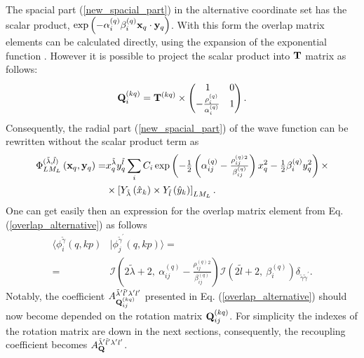 \documentclass[
12pt, %
oneside, %
english, %
onehalfspacing, %
onehalfspacing, %
headsepline, %
]{MastersDoctoralThesis} %
\begin{document}
The spacial part (\ref{new_spacial_part}) in the alternative coordinate set has the scalar product, $\exp \left(- \alpha_i^{(q)} \beta_i^{(q)}  {\bf x}_q \cdot {\bf y}_q  \right)$. With this form the overlap matrix elements can be calculated directly, using the expansion of the exponential function \cite{suzuki1998stochastic}. However it is possible  to project the scalar product into ${\bf T}$ matrix \cite{kukulin1990dynamic} as follows:
 \begin{equation}
{\bf Q}_i^{(kq)}= {\bf T}^{(kq)} \times
\begin{pmatrix}
1 &  0 \\ 
-\tfrac{\rho^{(q)}_{i}}{\alpha^{(q)}_i} & 1
\end{pmatrix} .
\end{equation}
Consequently, the radial part (\ref{new_spacial_part}) of the wave function can be rewritten without the scalar product term as
\begin{align}
 \Phi_{LM_L}^{(\tilde{\lambda},\tilde{l}) } \left(  {\bf x}_q, {\bf y}_q \right)  =  &
x^{\tilde{\lambda}}_q y^{\tilde{l}}_q 
\sum_i C_i 
\exp\left( - \tfrac{1}{2} 
\left( \alpha^{(q)}_{ij}-\tfrac{\rho^{(q)}_{ij}{}^2}{\beta^{(q)}_{ij}} \right)
 x^2_q -\tfrac{1}{2}  \beta_i^{(q)} y^2_q \right)
\times \nonumber \\
& \times \left[ 
Y_{\tilde{\lambda}} \left(\hat{x}_k \right) \times Y_{\tilde{l}} \left(\hat{y}_k \right)
\right]_{LM_L}.
\label{new_spacial_part}
\end{align}
One can get easily then an expression for the overlap matrix element from Eq. (\ref{overlap_alternative}) as follows
\begin{align}
\langle \phi_{i}^{\tilde{\gamma}}\left(q,kp \right) & \vert 
\phi_{j}^{\tilde{\gamma}^{\prime}}\left(q,kp \right) \rangle =
   \\
=& 
 \mathcal{I} \left( 2 \tilde{\lambda}+2,~
\alpha^{(q)}_{ij}-\tfrac{\rho^{(q)}_{ij}{}^2}{\beta^{(q)}_{ij}} 
  \right)
\mathcal{I} \left( 2 \tilde{l}+2, ~
\beta_i^{(q)} \right)
  \delta_{\tilde{\gamma}\tilde{\gamma}^{\prime}}. \nonumber
 \label{projectionMethod}
\end{align}
Notably, the coefficient $A^{\tilde{\lambda}' \tilde{l}' \lambda' l'}_{ \tiny {\bf Q}^{(kq)}_{ij} }$  presented in Eq. (\ref{overlap_alternative}) should now become depended on the rotation matrix ${\bf Q}^{(kq)}_{ij}$. For simplicity the indexes of the rotation matrix are down in the next sections, consequently, the recoupling coefficient becomes $A^{\tilde{\lambda}' \tilde{l}' \lambda' l'}_{  {\bf Q} }$.
\end{document}
